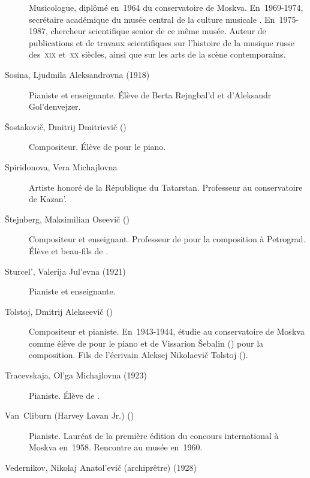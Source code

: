 \begin{description}
 Musicologue, diplômé en~1964 du conservatoire de Moskva.
 En~1969-1974, secrétaire académique du musée central de la culture musicale
 \MGlinka{}.
 En~1975-1987, chercheur scientifique senior de ce même musée.
 Auteur de publications et de travaux scientifiques sur l'histoire de la
 musique russe des~\textsc{xix}\ieme{} et~\textsc{xx}\ieme{} siècles, ainsi
 que sur les arts de la scène contemporains.
 \item[Sosina, Ljudmila Aleksandrovna (1918\dvsborn{})]%
 Pianiste et enseignante.
 Élève de Berta Rejngbal'd et d'\hbox{Aleksandr} Gol'denvejzer.
 \item[Šostakovič, Dmitrij Dmitrievič (\Dates{1906}{1975})]%
 Compositeur.
 Élève de \LNikolaiev{} pour le piano.
 \item[Spiridonova, Vera Michajlovna]%
 Artiste honoré de la République du Tatarstan.
 Professeur au conservatoire de Kazan'.
 \item[Štejnberg, Maksimilian Oseevič (\Dates{1883}{1946})]%
 Compositeur et enseignant.
 Professeur de \VSofronitsky{} pour la composition à Petrograd.
 Élève et beau-fils de \NRimskiKorsakov{}.
 \item[Sturcel', Valerija Jul'evna (1921\dvsborn{})]%
 Pianiste et enseignante.
 \item[Tolstoj, Dmitrij Alekseevič (\Dates{1923}{2003})]%
 Compositeur et pianiste.
 En~1943-1944, étudie au conservatoire de Moskva comme élève de
 \VSofronitsky{} pour le piano et de Vissarion Šebalin ()
 pour la composition.
 Fils de l'écrivain Aleksej Nikolaevič Tolstoj ().
 \item[Tracevskaja, Ol'ga Michajlovna (1923\dvsborn{})]%
 Pianiste.
 Élève de \VSofronitsky{}.
 \item[Van~Cliburn (Harvey Lavan Jr.) (\Dates{1934}{2013})]%
 Pianiste.
 Lauréat de la première édition du concours international \Tchaikovski{} à
 Moskva en~1958.
 Rencontre \VSofronitsky{} au musée \Scriabine{} en~1960.
 \item[Vedernikov, Nikolaj Anatol'evič (archiprêtre) (1928\dvsborn{})]%

\end{description}
